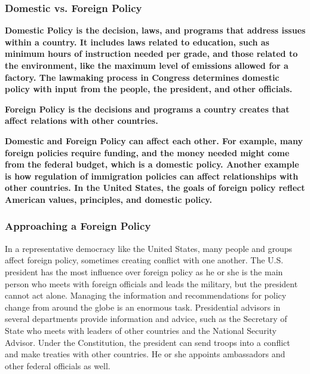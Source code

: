 
\subsubsection{Domestic vs. Foreign Policy}

\begin{definition}
  \bf{Domestic Policy} is the decision, laws, and programs that address issues
  within a country. It includes laws related to education, such as minimum hours
  of instruction needed per grade, and those related to the environment, like
  the maximum level of emissions allowed for a factory. The lawmaking process in
  Congress determines domestic policy with input from the people, the president,
  and other officials.
\end{definition}

\begin{definition}
  \bf{Foreign Policy} is the decisions and programs a country creates that
  affect relations with other countries.
\end{definition}

\bf{Domestic} and \bf{Foreign Policy} can affect each other. For example, many
foreign policies require funding, and the money needed might come from the
federal budget, which is a domestic policy. Another example is how regulation of
immigration policies can affect relationships with other countries. In the
United States, the goals of foreign policy reflect American values, principles,
and domestic policy.

\subsubsection{Approaching a Foreign Policy}

In a representative democracy like the United States, many people and groups
affect foreign policy, sometimes creating conflict with one another. The U.S.
president has the most influence over foreign policy as he or she is the main
person who meets with foreign officials and leads the military, but the
president cannot act alone. Managing the information and recommendations for
policy change from around the globe is an enormous task. Presidential advisors
in several departments provide information and advice, such as the Secretary of
State who meets with leaders of other countries and the National Security
Advisor. Under the Constitution, the president can send troops into a conflict
and make treaties with other countries. He or she appoints ambassadors and other
federal officials as well.

